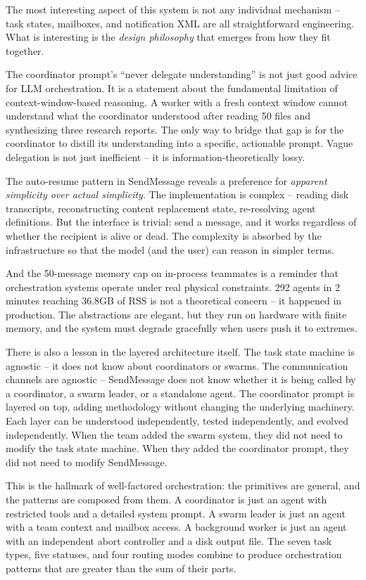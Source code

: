 \documentclass[
  english,
  11pt,
  letterpaper,
]{book}
\begin{document}
The most interesting aspect of this system is not any individual
mechanism -- task states, mailboxes, and notification XML are all
straightforward engineering. What is interesting is the \emph{design
philosophy} that emerges from how they fit together.

The coordinator prompt's ``never delegate understanding'' is not just
good advice for LLM orchestration. It is a statement about the
fundamental limitation of context-window-based reasoning. A worker with
a fresh context window cannot understand what the coordinator understood
after reading 50 files and synthesizing three research reports. The only
way to bridge that gap is for the coordinator to distill its
understanding into a specific, actionable prompt. Vague delegation is
not just inefficient -- it is information-theoretically lossy.

The auto-resume pattern in SendMessage reveals a preference for
\emph{apparent simplicity over actual simplicity}. The implementation is
complex -- reading disk transcripts, reconstructing content replacement
state, re-resolving agent definitions. But the interface is trivial:
send a message, and it works regardless of whether the recipient is
alive or dead. The complexity is absorbed by the infrastructure so that
the model (and the user) can reason in simpler terms.

And the 50-message memory cap on in-process teammates is a reminder that
orchestration systems operate under real physical constraints. 292
agents in 2 minutes reaching 36.8GB of RSS is not a theoretical concern
-- it happened in production. The abstractions are elegant, but they run
on hardware with finite memory, and the system must degrade gracefully
when users push it to extremes.

There is also a lesson in the layered architecture itself. The task
state machine is agnostic -- it does not know about coordinators or
swarms. The communication channels are agnostic -- SendMessage does not
know whether it is being called by a coordinator, a swarm leader, or a
standalone agent. The coordinator prompt is layered on top, adding
methodology without changing the underlying machinery. Each layer can be
understood independently, tested independently, and evolved
independently. When the team added the swarm system, they did not need
to modify the task state machine. When they added the coordinator
prompt, they did not need to modify SendMessage.

This is the hallmark of well-factored orchestration: the primitives are
general, and the patterns are composed from them. A coordinator is just
an agent with restricted tools and a detailed system prompt. A swarm
leader is just an agent with a team context and mailbox access. A
background worker is just an agent with an independent abort controller
and a disk output file. The seven task types, five statuses, and four
routing modes combine to produce orchestration patterns that are greater
than the sum of their parts.
\end{document}
